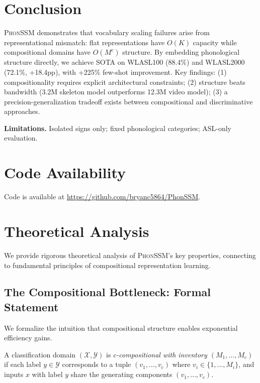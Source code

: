 \documentclass{article}
\newcommand{\phonssm}{\textsc{PhonSSM}}
\begin{document}
\section{Conclusion}

\phonssm{} demonstrates that vocabulary scaling failures arise from representational mismatch: flat representations have $O(K)$ capacity while compositional domains have $O(M^c)$ structure. By embedding phonological structure directly, we achieve SOTA on WLASL100 (88.4\%) and WLASL2000 (72.1\%, +18.4pp), with +225\% few-shot improvement. Key findings: (1) compositionality requires explicit architectural constraints; (2) structure beats bandwidth (3.2M skeleton model outperforms 12.3M video model); (3) a precision-generalization tradeoff exists between compositional and discriminative approaches.

\textbf{Limitations.} Isolated signs only; fixed phonological categories; ASL-only evaluation.




\newpage
\appendix
\section{Code Availability}
Code is available at \url{https://github.com/bryanc5864/PhonSSM}.

\section{Theoretical Analysis}
\label{app:theory}

We provide rigorous theoretical analysis of \phonssm{}'s key properties, connecting to fundamental principles of compositional representation learning.

\subsection{The Compositional Bottleneck: Formal Statement}

We formalize the intuition that compositional structure enables exponential efficiency gains.

\begin{definition}
A classification domain $(\mathcal{X}, \mathcal{Y})$ is \textit{$c$-compositional with inventory $(M_1, \ldots, M_c)$} if each label $y \in \mathcal{Y}$ corresponds to a tuple $(v_1, \ldots, v_c)$ where $v_i \in \{1, \ldots, M_i\}$, and inputs $x$ with label $y$ share the generating components $(v_1, \ldots, v_c)$.
\end{definition}
\end{document}
